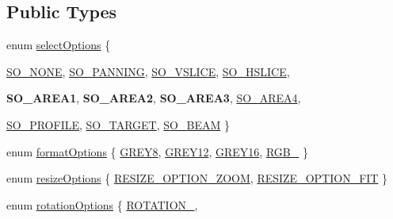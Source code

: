 \subsection*{Public Types}
\begin{DoxyCompactItemize}
\item 
enum \hyperlink{classQEImage_a2a0f3fb145abdf77229de456573b3360}{selectOptions} \{ \par
\hyperlink{classQEImage_a2a0f3fb145abdf77229de456573b3360a125a0ed9e3738724031c61a072c0835a}{SO\_\-NONE}, 
\hyperlink{classQEImage_a2a0f3fb145abdf77229de456573b3360a338fb593947772abece0f1e69f97baad}{SO\_\-PANNING}, 
\hyperlink{classQEImage_a2a0f3fb145abdf77229de456573b3360a7614d4cdf8d43a05e17595ab9804d849}{SO\_\-VSLICE}, 
\hyperlink{classQEImage_a2a0f3fb145abdf77229de456573b3360a452d2d6411e03be9642a9eb93c57ee06}{SO\_\-HSLICE}, 
\par
{\bfseries SO\_\-AREA1}, 
{\bfseries SO\_\-AREA2}, 
{\bfseries SO\_\-AREA3}, 
\hyperlink{classQEImage_a2a0f3fb145abdf77229de456573b3360a4efef95182ff85811f4c504e5bd04113}{SO\_\-AREA4}, 
\par
\hyperlink{classQEImage_a2a0f3fb145abdf77229de456573b3360ae00da71ebd1aca9cacc05caea9e302e3}{SO\_\-PROFILE}, 
\hyperlink{classQEImage_a2a0f3fb145abdf77229de456573b3360a1fda6b69414031eeeb7619318396eca5}{SO\_\-TARGET}, 
\hyperlink{classQEImage_a2a0f3fb145abdf77229de456573b3360aa70d1ec24fb8c71a3240903edccd6c8b}{SO\_\-BEAM}
 \}
\item 
enum \hyperlink{classQEImage_aec1df5ac4b48c529744b48de7722c55e}{formatOptions} \{ \hyperlink{classQEImage_aec1df5ac4b48c529744b48de7722c55ea266064fd0b145012c7aa8963d517d67c}{GREY8}, 
\hyperlink{classQEImage_aec1df5ac4b48c529744b48de7722c55eaaeac65899916ef3f61156e0fb47a9995}{GREY12}, 
\hyperlink{classQEImage_aec1df5ac4b48c529744b48de7722c55ea5301ac5f1734b260f5d949e7db59650f}{GREY16}, 
\hyperlink{classQEImage_aec1df5ac4b48c529744b48de7722c55ea1fb9652f463587aa13108cca8229358e}{RGB\_}
 \}
\item 
enum \hyperlink{classQEImage_ab70b57397dad6bbe6e659f9831a481dd}{resizeOptions} \{ \hyperlink{classQEImage_ab70b57397dad6bbe6e659f9831a481dda7a6f1f1ccf251dbc6898598136448a0f}{RESIZE\_\-OPTION\_\-ZOOM}, 
\hyperlink{classQEImage_ab70b57397dad6bbe6e659f9831a481ddab967ec20b8d24c42e261f81ecb07d688}{RESIZE\_\-OPTION\_\-FIT}
 \}
\item 
enum \hyperlink{classQEImage_af3827d9fcef5cb397ac947e48558208a}{rotationOptions} \{ \hyperlink{classQEImage_af3827d9fcef5cb397ac947e48558208aa56872da4f4180c8b920bea7e5ccf4ab2}{ROTATION\_}, 

\end{DoxyCompactItemize}
